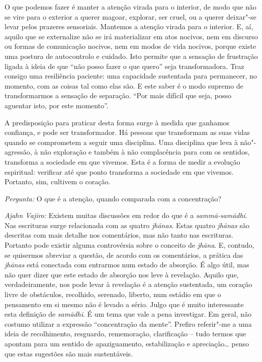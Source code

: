 \enlargethispage{\baselineskip}

O que podemos fazer é manter a atenção virada para o interior, de modo que não
se vire para o exterior a querer magoar, explorar, ser cruel, ou a querer
deixar"-se levar pelos prazeres sensoriais. Mantemos a atenção virada para o
interior. E, aí, aquilo que se externalize não se irá materializar em atos
nocivos, nem em discurso ou formas de comunicação nocivos, nem em modos de vida
nocivos, porque existe uma postura de autocontrolo e cuidado. Isto permite que a
sensação de frustração ligada à ideia de que ``não posso fazer o que quero''
seja transformadora. Traz consigo uma resiliência paciente: uma capacidade
sustentada para permanecer, no momento, com as coisas tal como elas são. E este
saber é o modo supremo de transformarmos a sensação de separação. ``Por mais
difícil que seja, posso aguentar isto, por este momento''.

A predisposição para praticar desta forma surge à medida que ganhamos confiança,
e pode ser transformador. Há pessoas que transformam as suas vidas quando se
comprometem a seguir uma disciplina. Uma disciplina que leva à não"-agressão, à
não exploração e também à não complacência para com os sentidos, transforma a
sociedade em que vivemos. Esta é a forma de medir a evolução espiritual:
verificar até que ponto transforma a sociedade em que vivemos. Portanto, sim,
cultivem o coração.

\bigskip

\emph{Pergunta:} O que é a atenção, quando comparada com a concentração?

\emph{Ajahn Vajiro:} Existem muitas discussões em redor do que é a
\emph{sammā-samādhi}. Nas escrituras surge relacionada com as quatro
\emph{jhānas}. Estas quatro \emph{jhānas} são descritas com mais detalhe nos
comentários, mas não tanto nas escrituras. Portanto pode existir alguma
controvérsia sobre o conceito de \emph{jhāna}. E, contudo, se quisermos abreviar
a questão, de acordo com os comentários, a prática das \emph{jhānas} está
conectada com entrarmos num estado de absorção. É algo útil, mas não quer dizer
que este estado de absorção nos leve à revelação. Aquilo que, verdadeiramente,
nos pode levar à revelação é a atenção sustentada, um coração livre de
obstáculos, recolhido, serenado, liberto, num estádio em que o pensamento em si
mesmo não é levado a sério. Julgo que é muito interessante esta definição de
\emph{samādhi}. É um tema que vale a pena investigar. Em geral, não costumo
utilizar a expressão ``concentração da mente''. Prefiro referir"-me a uma ideia
de recolhimento, resguardo, rememoração, clarificação -- tudo termos que apontam
para um sentido de apaziguamento, estabilização e apreciação\ldots{} penso que
estas sugestões são mais sustentáveis.

